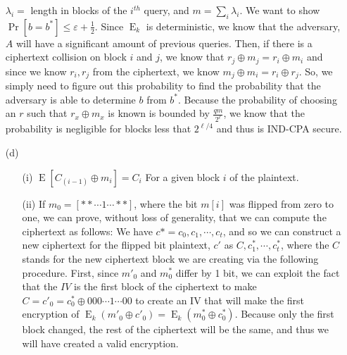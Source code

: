 \documentclass[11pt]{article}
\newcommand{\E}{\mathop{\textrm{E}}}
\begin{document}
\begin{itemize}
  $\lambda_i =$ length in blocks of the $i^{th}$ query, and $m = \sum_i \lambda_i$.
  We want to show $\Pr[b=b^*] \leq \varepsilon + \frac{1}{2}$. Since $\E_k$ is deterministic, 
  we know that the adversary, $A$ will have a significant amount of previous queries. Then, if 
  there is a ciphertext collision on block $i$ and $j$, we know that $r_j \oplus m_j =
  r_i \oplus m_i$ and since we know $r_i, r_j$ from the ciphertext, we know $m_j \oplus m_i 
  = r_i \oplus r_j$. So, we simply need to figure out this probability to find the 
  probability that the adversary is able to determine $b$ from $b^*$. Because the probability of
  choosing an $r$ such that $r_x \oplus m_x$ is known is bounded by $\frac{qm}{2^\ell}$, we 
  know that the probability is negligible for blocks less that $2^{\ell/4}$ and thus is 
  IND-CPA secure.

\item[(d)] 
  \begin{itemize}
    \item[(i)]
      $\E[C_(i-1) \oplus m_i] = C_i$
      For a given block $i$ of the plaintext.
    \item[(ii)]
      If $m_0 = [* * \cdots 1 \cdots * *]$, where the bit $m[i]$ was flipped from zero to one, 
      we can prove, without loss of generality, that we can compute the ciphertext as follows:
      We have $c* = c_0, c_1, \cdots, c_t$, and so we can construct a new ciphertext for the 
      flipped bit plaintext, $c'$ as $C,  c^*_1, \cdots, c^*_t$, where the $C$ stands for the 
      new ciphertext block we are creating via the following procedure. First, since $m'_0$ and
      $m^*_0$ differ by 1 bit, we can exploit the fact that the $IV$ is the first block of the 
      ciphertext to make $C = c'_0 = c^*_0 \oplus 000\cdots1\cdots00$ to create an IV that will make
      the first encryption of $\E_k(m'_0 \oplus c'_0) = \E_k(m^*_0 \oplus c^*_0)$. Because only
      the first block changed, the rest of the ciphertext will be the same, and thus we will have
      created a valid encryption.
  \end{itemize}
\end{itemize}
\end{document}

